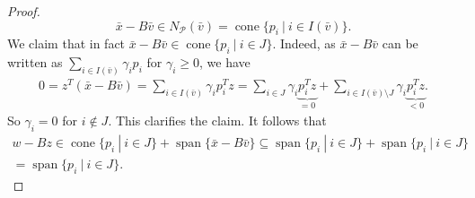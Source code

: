 \documentclass[reqno]{amsart}
\numberwithin{equation}{section}
\newcommand{\pol}{\mathcal{P}}
\begin{document}
\begin{proof}
\[
\bar{x} - B \bar{v} \in N_{\pol}(\bar{v}) = \operatorname{cone}\{p_i \ | \ i \in I(\bar{v})\}.
\]
We claim that in fact $\bar{x} - B \bar{v} \in \operatorname{cone} \{p_i \ | \ i \in J\}$.
Indeed, as $\bar{x} - B \bar{v}$ can be written as $\sum_{i \in I(\bar{v})} \gamma_i p_i$ for $\gamma_i \ge 0$,  we have 
\begin{align*}
    0 = z^T(\bar x-B\bar{v})=\sum\limits_{i \in I(\bar{v})} \gamma_i p_i^Tz = \sum\limits_{i \in J} \gamma_i \underbrace{p_i^Tz}_{ = 0} + \sum\limits_{i \in I(\bar{v}) \setminus J} \gamma_i \underbrace{p_i^Tz}_{< 0}.
\end{align*} So $\gamma_i = 0$ for $i \not \in J$. This clarifies the claim. It follows that 
\begin{align*}
    w - Bz \in \operatorname{cone}\{p_i \ | \ i \in J\} + \operatorname{span}\{\bar{x} - B \bar{v}\} \subseteq \operatorname{span}\{p_i \ | \ i \in J\} + \operatorname{span}\{p_i \ | \ i \in J\} 
    \\ = \operatorname{span}\{p_i \ | \ i \in J\}.
\end{align*}


\end{proof}
\end{document}
